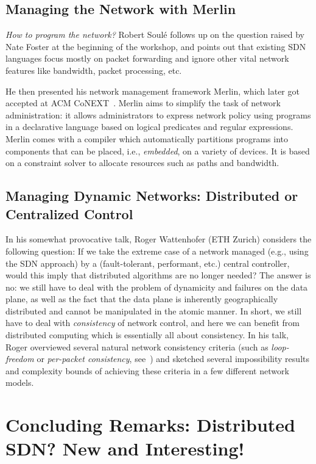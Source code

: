 \documentclass[11pt,pdftex,letter]{article}
\begin{document}
\subsection{Managing the Network with Merlin}

\emph{How to program the network?} Robert Soul\'{e} follows up on the question raised by Nate Foster
at the beginning of the workshop, and points out that
existing SDN languages focus mostly
on packet forwarding and
ignore other vital network features like
bandwidth, packet processing, etc.

He then presented his network management framework Merlin, which later got
accepted at ACM CoNEXT~\cite{merlin}. Merlin aims to
simplify the task of network administration: it
allows administrators to express network policy using programs in a declarative language based on logical predicates and regular expressions.
Merlin comes with a compiler which automatically partitions programs into components that can be placed, i.e., \emph{embedded}, on a variety of devices.
It is based on a constraint solver to allocate resources such as paths and bandwidth.

\subsection{Managing Dynamic Networks: Distributed or Centralized
  Control}

In his somewhat provocative talk, Roger Wattenhofer (ETH Zurich) considers
the following question: If we take the extreme case of a network
managed (e.g., using the SDN approach) by a (fault-tolerant,
performant, etc.) central controller, would this imply
that distributed algorithms are no longer needed? The answer is no: we still have to deal with the problem of
dynamicity and failures on the data plane, as well as the fact that
the data plane is inherently geographically distributed and cannot be
manipulated in the atomic manner. In short, we still have to deal with
\emph{consistency} of network control, and here we can benefit from
distributed computing which is essentially all about consistency.
In his talk, Roger overviewed several natural network consistency
criteria (such as \emph{loop-freedom} or \emph{per-packet
  consistency}, see~\cite{roger-hotnets}) and sketched several impossibility results and
complexity bounds of achieving these criteria in a few different
network models.


\section{Concluding Remarks: Distributed SDN? New and Interesting!}
\end{document}
